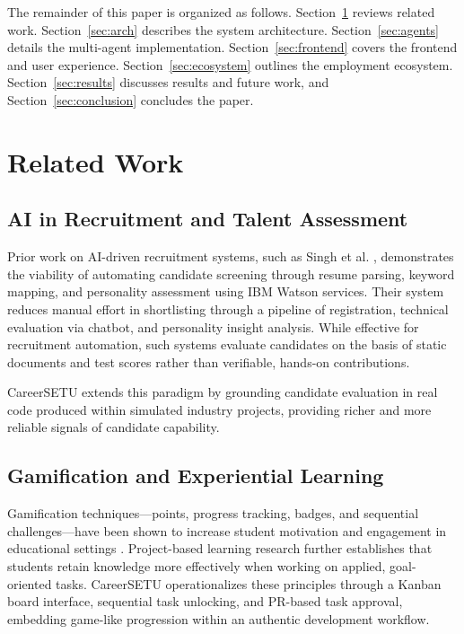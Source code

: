 \documentclass[runningheads]{llncs}
\begin{document}
The remainder of this paper is organized as follows. Section~\ref{sec:related} reviews related work. Section~\ref{sec:arch} describes the system architecture. Section~\ref{sec:agents} details the multi-agent implementation. Section~\ref{sec:frontend} covers the frontend and user experience. Section~\ref{sec:ecosystem} outlines the employment ecosystem. Section~\ref{sec:results} discusses results and future work, and Section~\ref{sec:conclusion} concludes the paper.

\section{Related Work}
\label{sec:related}

\subsection{AI in Recruitment and Talent Assessment}

Prior work on AI-driven recruitment systems, such as Singh et al. \cite{b4}, demonstrates the viability of automating candidate screening through resume parsing, keyword mapping, and personality assessment using IBM Watson services. Their system reduces manual effort in shortlisting through a pipeline of registration, technical evaluation via chatbot, and personality insight analysis. While effective for recruitment automation, such systems evaluate candidates on the basis of static documents and test scores rather than verifiable, hands-on contributions.

CareerSETU extends this paradigm by grounding candidate evaluation in real code produced within simulated industry projects, providing richer and more reliable signals of candidate capability.

\subsection{Gamification and Experiential Learning}

Gamification techniques---points, progress tracking, badges, and sequential challenges---have been shown to increase student motivation and engagement in educational settings \cite{b5}. Project-based learning research further establishes that students retain knowledge more effectively when working on applied, goal-oriented tasks. CareerSETU operationalizes these principles through a Kanban board interface, sequential task unlocking, and PR-based task approval, embedding game-like progression within an authentic development workflow.
\end{document}

